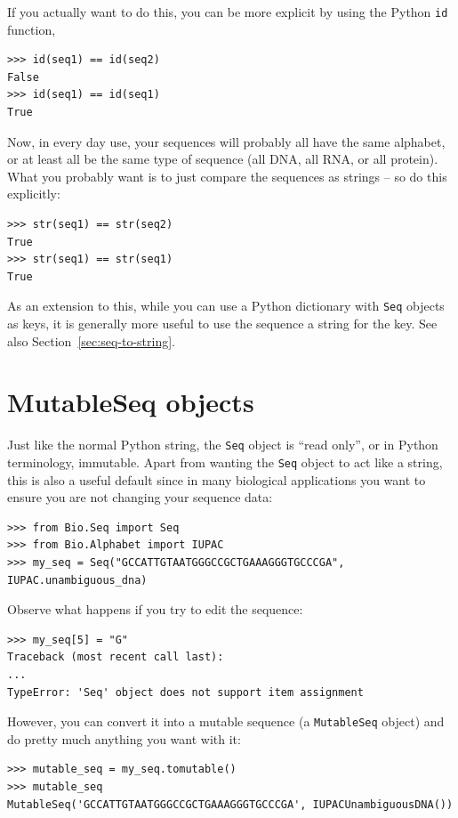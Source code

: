\documentclass{report}
\begin{document}
If you actually want to do this, you can be more explicit by using the Python
\verb|id| function,
\begin{verbatim}
>>> id(seq1) == id(seq2)
False
>>> id(seq1) == id(seq1)
True
\end{verbatim}

Now, in every day use, your sequences will probably all have the same
alphabet, or at least all be the same type of sequence (all DNA, all RNA, or
all protein). What you probably want is to just compare the sequences as
strings -- so do this explicitly:
\begin{verbatim}
>>> str(seq1) == str(seq2)
True
>>> str(seq1) == str(seq1)
True
\end{verbatim}

\noindent As an extension to this, while you can use a Python dictionary with
\verb|Seq| objects as keys, it is generally more useful to use the sequence a
string for the key. See also Section~\ref{sec:seq-to-string}.

\section{MutableSeq objects}
\label{sec:mutable-seq}

Just like the normal Python string, the \verb|Seq| object is ``read only'', or in Python terminology, immutable.  Apart from wanting the \verb|Seq| object to act like a string, this is also a useful default since in many biological applications you want to ensure you are not changing your sequence data:

\begin{verbatim}
>>> from Bio.Seq import Seq
>>> from Bio.Alphabet import IUPAC
>>> my_seq = Seq("GCCATTGTAATGGGCCGCTGAAAGGGTGCCCGA", IUPAC.unambiguous_dna)
\end{verbatim}

Observe what happens if you try to edit the sequence:
\begin{verbatim}
>>> my_seq[5] = "G"
Traceback (most recent call last):
...
TypeError: 'Seq' object does not support item assignment
\end{verbatim}

However, you can convert it into a mutable sequence (a \verb|MutableSeq| object) and do pretty much anything you want with it:

\begin{verbatim}
>>> mutable_seq = my_seq.tomutable()
>>> mutable_seq
MutableSeq('GCCATTGTAATGGGCCGCTGAAAGGGTGCCCGA', IUPACUnambiguousDNA())
\end{verbatim}
\end{document}
